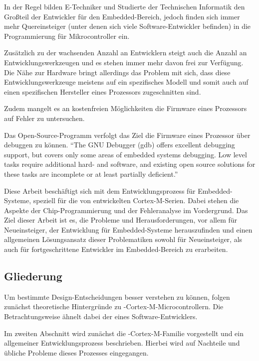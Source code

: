     In der Regel bilden E-Techniker und Studierte der Technischen Informatik den Großteil der Entwickler für den
    Embedded-Bereich, jedoch finden sich immer mehr Quereinsteiger (unter denen sich viele Software-Entwickler befinden)
    in die Programmierung für Mikrocontroller ein.

    Zusätzlich zu der wachsenden Anzahl an Entwicklern steigt auch die Anzahl an Entwicklungswerkzeugen und es stehen
    immer mehr davon frei zur Verfügung. Die Nähe zur Hardware bringt allerdings das Problem mit sich,
    dass diese Entwicklungswerkzeuge meistens auf ein spezifisches Modell und somit auch auf einen spezifischen
    Hersteller eines Prozessors zugeschnitten sind.

    Zudem mangelt es an kostenfreien Möglichkeiten die Firmware eines Prozessors auf Fehler zu untersuchen.

    Das Open-Source-Programm
     verfolgt das Ziel die Firmware eines Prozessor über  debuggen zu können.
    ``The GNU Debugger
      (gdb) offers excellent debugging support, but covers only some areas of embedded systems debugging.
      Low level tasks require additional hard- and software, and existing open source solutions for these tasks
      are incomplete or at least partially deficient.''\citep[vgl. Introduction]{Rath2005}

    Diese Arbeit beschäftigt sich mit dem Entwicklungsprozess für Embedded\hyp{}Systeme, speziell für die von 
    entwickelten Cortex\hyp{}M\hyp{}Serien.
    Dabei stehen die Aspekte der Chip-Programmierung und der Fehleranalyse im Vordergrund. Das Ziel dieser Arbeit
    ist es, die Probleme und Herausforderungen, vor allem für Neueinsteiger, der Entwicklung für Embedded-Systeme herauszufinden und
    einen allgemeinen Lösungsansatz dieser Problematiken sowohl für Neueinsteiger, als auch für fortgeschrittene
    Entwickler im Embedded-Bereich zu erarbeiten.

    \subsection{Gliederung}
    Um bestimmte Design-Entscheidungen besser verstehen zu können, folgen zunächst theoretische Hintergründe zu
    -Cortex-M-Microcontrollern. Die Betrachtungsweise ähnelt dabei der eines Software-Entwicklers.

    Im zweiten Abschnitt wird zunächst die -Cortex-M-Familie vorgestellt und ein allgemeiner Entwicklungsprozess
    beschrieben. Hierbei wird auf Nachteile und übliche Probleme dieses Prozesses eingegangen.

